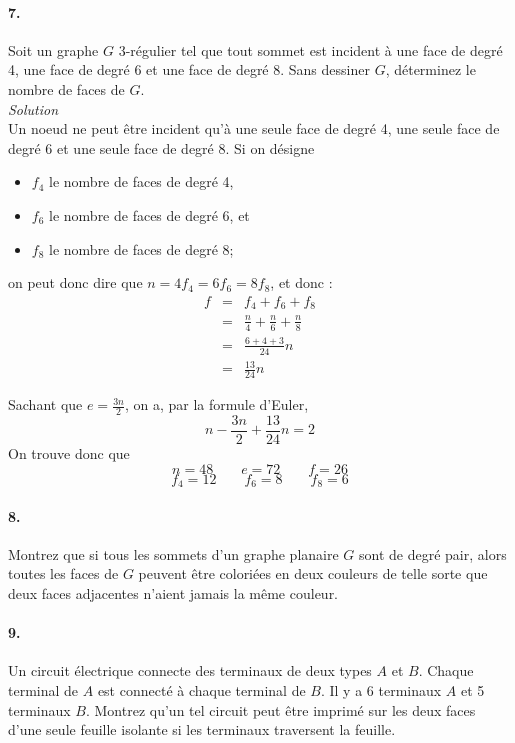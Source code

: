 \paragraph{7. }Soit un graphe $G$ 3-régulier tel que tout sommet est incident à une face de degré 4, une face de degré 6 et une face de degré 8. Sans dessiner $G$, déterminez le nombre de faces de $G$.\\

\textit{Solution}\\

Un noeud ne peut être incident qu'à une seule face de degré 4, une seule face de degré 6 et une seule face de degré 8. Si on désigne
\begin{itemize}
\item $f_4$ le nombre de faces de degré 4,
\item $f_6$ le nombre de faces de degré 6, et
\item $f_8$ le nombre de faces de degré 8;
\end{itemize}
on peut donc dire que $n = 4f_4 = 6f_6 = 8f_8$, et donc : 
\[  
\begin{array}{rcl}
f &=& f_4 + f_6 + f_8 \\
  &=& \frac{n}{4} + \frac{n}{6} + \frac{n}{8} \\
  &=& \frac{6 + 4 + 3}{24} n \\
  &=& \frac{13}{24} n 
\end{array}
\]

Sachant que $e = \frac{3n}{2}$, on a, par la formule d'Euler, $$ n - \frac{3n}{2} + \frac{13}{24} n = 2 $$
On trouve donc que $$ n = 48 \qquad e = 72 \qquad f = 26$$
$$ f_4 = 12 \qquad f_6 = 8 \qquad f_8 = 6$$

\paragraph{8. }Montrez que si tous les sommets d'un graphe planaire $G$ sont de degré pair, alors toutes les faces de $G$ peuvent être coloriées en deux couleurs de telle sorte que deux faces adjacentes n'aient jamais la même couleur. 

\nosolution

\paragraph{9. }Un circuit électrique connecte des terminaux de deux types $A$ et $B$. Chaque terminal de $A$ est connecté à chaque terminal de $B$. Il y a 6 terminaux $A$ et 5 terminaux $B$. Montrez qu'un tel circuit peut être imprimé sur les deux faces d'une seule feuille isolante si les terminaux traversent la feuille.

\nosolution